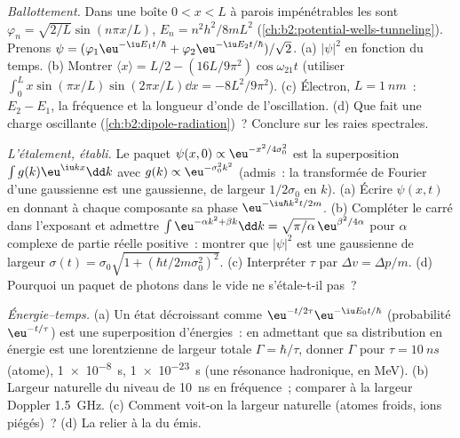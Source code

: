 \begin{exercise}[$\star\star\star$]\label{exo:b2:schrodinger-wave-functions:10}
\emph{Ballottement.} Dans une boîte $0 < x < L$ à parois impénétrables les
 sont $\varphi_n = \sqrt{2/L}\sin(n\pi x/L)$, $E_n =
n^2h^2/8mL^2$ (\cref{ch:b2:potential-wells-tunneling}). Prenons $\psi =
(\varphi_1\eu^{-\iu E_1t/\hbar} + \varphi_2\eu^{-\iu E_2t/\hbar})/\sqrt2$. (a)
$|\psi|^2$ en fonction du temps. (b) Montrer $\langle x\rangle = L/2 -
(16L/9\pi^2)\cos\omega_{21}t$ (utiliser $\int_0^L x\sin(\pi x/L)\sin(2\pi x/L)\dd x
= -8L^2/9\pi^2$). (c) Électron, $L = \qty{1}{nm}$~: $E_2 - E_1$, la
fréquence et la longueur d'onde de l'oscillation. (d) Que fait une charge
oscillante (\cref{ch:b2:dipole-radiation})~? Conclure sur les
raies spectrales.
\end{exercise}

\begin{exercise}[$\star\star\star$]\label{exo:b2:schrodinger-wave-functions:11}
\emph{L'étalement, établi.} Le paquet $\psi(x,0) \propto \eu^{-x^2/4\sigma_0^2}$
est la superposition $\int g(k)\eu^{\iu kx}\dd k$ avec $g(k) \propto
\eu^{-\sigma_0^2k^2}$ (admis~: la transformée de Fourier d'une gaussienne est une
gaussienne, de largeur $1/2\sigma_0$ en $k$). (a) Écrire $\psi(x,t)$ en donnant à chaque
composante sa phase $\eu^{-\iu\hbar k^2t/2m}$. (b) Compléter le carré dans
l'exposant et admettre $\int\eu^{-\alpha k^2 + \beta k}\dd k = \sqrt{\pi/\alpha}\,
\eu^{\beta^2/4\alpha}$ pour $\alpha$ complexe de partie réelle positive~: montrer que
$|\psi|^2$ est une gaussienne de largeur $\sigma(t) = \sigma_0\sqrt{1 + (\hbar t/2m
\sigma_0^2)^2}$. (c) Interpréter $\tau$ par $\Delta v = \Delta p/m$. (d) Pourquoi
un paquet de photons dans le vide ne s'étale-t-il pas~?
\end{exercise}

\begin{exercise}[$\star\star\star$]\label{exo:b2:schrodinger-wave-functions:12}
\emph{Énergie--temps.} (a) Un état décroissant comme $\eu^{-t/2\tau}\eu^{-\iu E_0t/\hbar}$
(probabilité $\eu^{-t/\tau}$) est une superposition d'énergies~: en admettant
que sa distribution en énergie est une lorentzienne de largeur totale $\Gamma =
\hbar/\tau$, donner $\Gamma$ pour $\tau = \qty{10}{ns}$ (atome), \qty{1e-8}{s},
\qty{1e-23}{s} (une résonance hadronique, en MeV). (b) Largeur naturelle du
niveau de \qty{10}{ns} en fréquence~; comparer à la largeur Doppler
\qty{1.5}{GHz}. (c) Comment voit-on la largeur naturelle (atomes froids,
ions piégés)~? (d) La relier à la  du 
émis.
\end{exercise}


